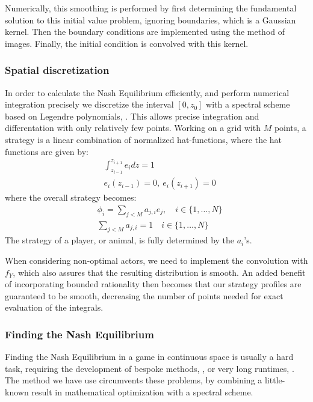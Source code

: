 Numerically, this smoothing is performed by first determining the fundamental solution to this initial value problem, ignoring boundaries, which is a Gaussian kernel. Then the boundary conditions are implemented using the method of images. Finally, the initial condition is convolved with this kernel.


\subsubsection*{Spatial discretization}
In order to calculate the Nash Equilibrium efficiently, and perform numerical integration precisely we discretize the interval $[0,z_0]$ with a spectral scheme based on Legendre polynomials, \citep{kopriva2009implementing}. This allows precise integration and differentation with only relatively few points. Working on a grid with $M$ points, a strategy is a linear combination of normalized hat-functions, where the hat functions are given by:
\begin{align*}
	& \int_{z_{i-1}}^{z_{i+1}} e_i dz = 1 \\
	&e_i(z_{i-1}) = 0,~ e_i(z_{i+1}) = 0
\end{align*}
where the overall strategy becomes:
\begin{align*}
  &\phi_{i} = \sum_{j<M} a_{j,i} e_j, \quad i\in \{1,\dots, N\} \\
  &\sum_{j<M} a_{j,i} = 1 \quad i\in \{1,\dots, N\}
\end{align*}
The strategy of a player, or animal, is fully determined by the $a_i$'s.


When considering non-optimal actors, we need to implement the convolution with $f_Y$, which also assures that the resulting distribution is smooth. An added benefit of incorporating bounded rationality then becomes that our strategy profiles are guaranteed to be smooth, decreasing the number of points needed for exact evaluation of the integrals.


\subsubsection*{Finding the Nash Equilibrium}
Finding the Nash Equilibrium in a game in continuous space is usually a hard task, requiring the development of bespoke methods, \citep{verticalmigration}, or very long runtimes, \citep{jerome}. The method we have use circumvents these problems, by combining a little-known result in mathematical optimization with a spectral scheme.

